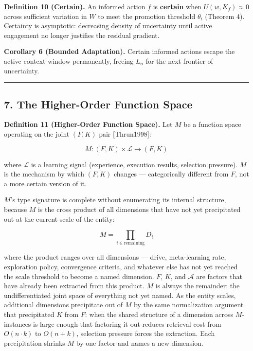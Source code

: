 \documentclass[
]{article}
\begin{document}
\textbf{Definition 10 (Certain).} An informed action \(f\) is
\textbf{certain} when \(U(w, K_f) \approx 0\) across sufficient
variation in \(W\) to meet the promotion threshold \(\theta_i\) (Theorem
4). Certainty is asymptotic: decreasing density of uncertainty until
active engagement no longer justifies the residual gradient.

\textbf{Corollary 6 (Bounded Adaptation).} Certain informed actions
escape the active context window permanently, freeing \(L_n\) for the
next frontier of uncertainty.

\begin{center}\rule{0.5\linewidth}{0.5pt}\end{center}

\subsection{7. The Higher-Order Function
Space}\label{the-higher-order-function-space}

\textbf{Definition 11 (Higher-Order Function Space).} Let \(M\) be a
function space operating on the joint \((F, K)\) pair {[}Thrun1998{]}:

\[M : (F, K) \times \mathcal{L} \rightarrow (F, K)\]

where \(\mathcal{L}\) is a learning signal (experience, execution
results, selection pressure). \(M\) is the mechanism by which
\((F, K)\) changes --- categorically different from \(F\), not a more
certain version of it.

\(M\)'s type signature is complete without enumerating its internal
structure, because \(M\) is the cross product of all dimensions that
have not yet precipitated out at the current scale of the entity:

\[M = \prod_{i \in \text{remaining}} D_i\]

where the product ranges over all dimensions --- drive, meta-learning
rate, exploration policy, convergence criteria, and whatever else has
not yet reached the scale threshold to become a named dimension. \(F\),
\(K\), and \(\mathcal{A}\) are factors that have already been extracted
from this product. \(M\) is always the remainder: the undifferentiated
joint space of everything not yet named. As the entity scales,
additional dimensions precipitate out of \(M\) by the same normalization
argument that precipitated \(K\) from \(F\): when the shared structure
of a dimension across \(M\)-instances is large enough that factoring it
out reduces retrieval cost from \(O(n \cdot k)\) to \(O(n + k)\),
selection pressure forces the extraction. Each precipitation shrinks
\(M\) by one factor and names a new dimension.
\end{document}
